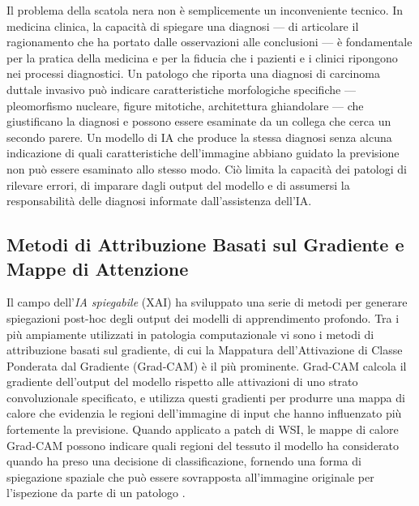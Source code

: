 Il problema della scatola nera non è semplicemente un inconveniente tecnico. In medicina clinica, la capacità di spiegare una diagnosi — di articolare il ragionamento che ha portato dalle osservazioni alle conclusioni — è fondamentale per la pratica della medicina e per la fiducia che i pazienti e i clinici ripongono nei processi diagnostici. Un patologo che riporta una diagnosi di carcinoma duttale invasivo può indicare caratteristiche morfologiche specifiche — pleomorfismo nucleare, figure mitotiche, architettura ghiandolare — che giustificano la diagnosi e possono essere esaminate da un collega che cerca un secondo parere. Un modello di IA che produce la stessa diagnosi senza alcuna indicazione di quali caratteristiche dell'immagine abbiano guidato la previsione non può essere esaminato allo stesso modo. Ciò limita la capacità dei patologi di rilevare errori, di imparare dagli output del modello e di assumersi la responsabilità delle diagnosi informate dall'assistenza dell'IA.

\subsection{Metodi di Attribuzione Basati sul Gradiente e Mappe di Attenzione}

Il campo dell'\emph{IA spiegabile} (XAI) ha sviluppato una serie di metodi per generare spiegazioni post-hoc degli output dei modelli di apprendimento profondo. Tra i più ampiamente utilizzati in patologia computazionale vi sono i metodi di attribuzione basati sul gradiente, di cui la Mappatura dell'Attivazione di Classe Ponderata dal Gradiente (Grad-CAM) è il più prominente. Grad-CAM calcola il gradiente dell'output del modello rispetto alle attivazioni di uno strato convoluzionale specificato, e utilizza questi gradienti per produrre una mappa di calore che evidenzia le regioni dell'immagine di input che hanno influenzato più fortemente la previsione. Quando applicato a patch di WSI, le mappe di calore Grad-CAM possono indicare quali regioni del tessuto il modello ha considerato quando ha preso una decisione di classificazione, fornendo una forma di spiegazione spaziale che può essere sovrapposta all'immagine originale per l'ispezione da parte di un patologo \cite{amann2020}.

